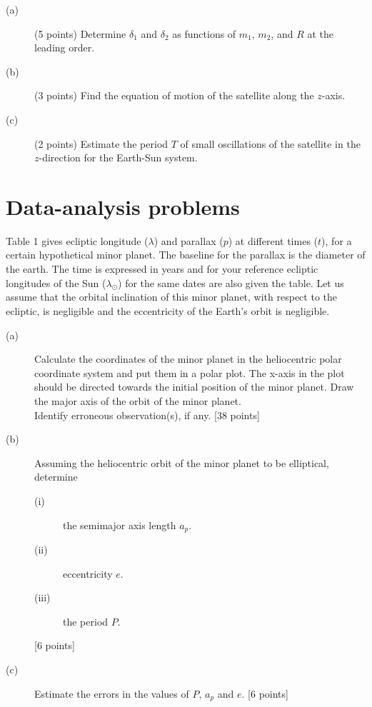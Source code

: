 
\begin{description}
\item[(a)] (5 points) Determine $\delta_1$ and $\delta_2$ as functions of
  $m_1$, $m_2$, and $R$ at the leading order.
\item[(b)] (3 points) Find the equation of motion of the satellite along the
  $z$-axis.
\item[(c)] (2 points) Estimate the period $T$ of small oscillations of the
  satellite in the $z$-direction for the Earth-Sun system.
\end{description}

\section*{Data-analysis problems}

Table 1 gives ecliptic longitude ($\lambda$) and parallax ($p$) at different
times ($t$), for a certain hypothetical minor planet. The baseline for the
parallax is the diameter of the earth. The time is expressed in years and for
your reference ecliptic longitudes of the Sun ($\lambda_\odot$) for the same
dates are also given the table. Let us assume that the orbital inclination of
this minor planet, with respect to the ecliptic, is negligible and the
eccentricity of the Earth's orbit is negligible.

\begin{description}
\item[(a)] Calculate the coordinates of the minor planet in the heliocentric
  polar coordinate system and put them in a polar plot. The x-axis in the plot
  should be directed towards the initial position of the minor planet. Draw
  the major axis of the orbit of the minor planet.\\
  Identify erroneous observation(s), if any. \hfill[38 points]
\item[(b)] Assuming the heliocentric orbit of the minor planet to be
  elliptical, determine
  \begin{description}
  \item[(i)] the semimajor axis length $a_p$.
  \item[(ii)] eccentricity $e$.
  \item[(iii)] the period $P$.
  \end{description}
  \hfill[6 points]
\item[(c)] Estimate the errors in the values of $P$, $a_p$ and $e$.
  \hfill[6 points]
\end{description}

